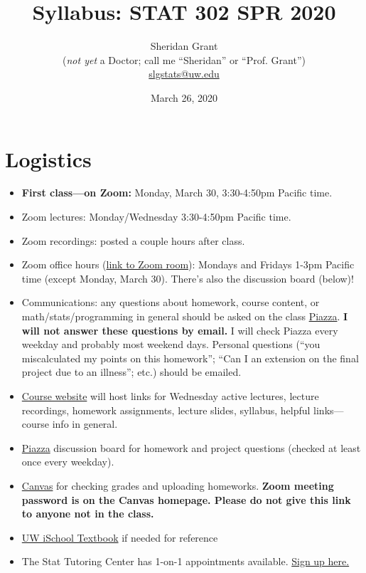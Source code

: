 \documentclass[12pt]{article}
\title{Syllabus: STAT 302 SPR 2020}
\author{Sheridan Grant\\(\textit{not yet} a Doctor; call me ``Sheridan'' or ``Prof. Grant'')\\\href{mailto:slgstats@uw.edu}{slgstats@uw.edu}}
\date{March 26, 2020}
\begin{document}
\sloppy

\maketitle

\section*{Logistics}

\begin{itemize}
	\item \textbf{First class---on Zoom:} Monday, March 30, 3:30-4:50pm Pacific time.
	\item Zoom lectures: Monday/Wednesday 3:30-4:50pm Pacific time.
	\item Zoom recordings: posted a couple hours after class.
	\item Zoom office hours (\href{https://washington.zoom.us/j/7876861762?pwd=Nld6U2cvMWlUOVJUZ1B1UWVUbkFBQT09}{link to Zoom room}): Mondays and Fridays 1-3pm Pacific time (except Monday, March 30). There's also the discussion board (below)!
	\item Communications: any questions about homework, course content, or math/stats/programming in general should be asked on the class \href{https://piazza.com/washington/spring2020/stat302}{Piazza}. \textbf{I will not answer these questions by email.} I will check Piazza every weekday and probably most weekend days. Personal questions (``you miscalculated my points on this homework''; ``Can I an extension on the final project due to an illness''; etc.) should be emailed.
	\item \href{https://sheridanlgrant.github.io/teaching/STAT302_SPR2020}{Course website} will host links for Wednesday active lectures, lecture recordings, homework assignments, lecture slides, syllabus, helpful links---course info in general.
	\item \href{https://piazza.com/washington/spring2020/stat302}{Piazza} discussion board for homework and project questions (checked at least once every weekday).
	\item \href{https://canvas.uw.edu/}{Canvas} for checking grades and uploading homeworks. \textbf{Zoom meeting password is on the Canvas homepage. Please do not give this link to anyone not in the class.}
	\item \href{https://info201.github.io/}{UW iSchool Textbook} if needed for reference
	\item The Stat Tutoring Center has 1-on-1 appointments available. \href{https://www.stat.washington.edu/academics/tutoring}{Sign up here.}
\end{itemize}
\end{document}
